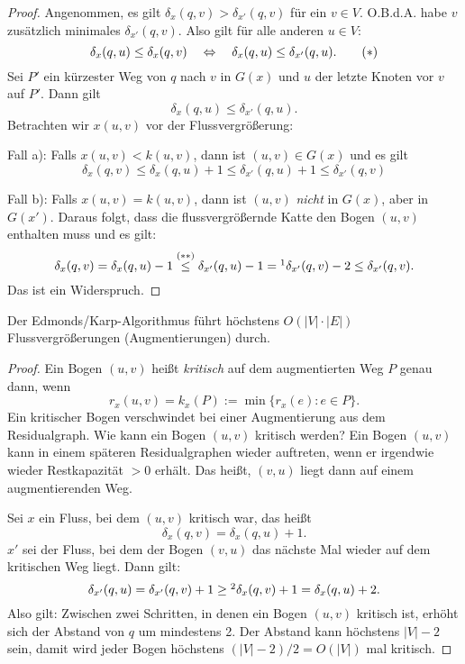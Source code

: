 \begin{proof}
  Angenommen, es gilt $\delta_x(q,v) > \delta_{x'}(q,v)$ für ein $v \in V$.
  O.B.d.A. habe $v$ zusätzlich minimales $\delta_{x'}(q,v)$. Also gilt für alle
  anderen $u \in V$:
  \[ \delta_x(q,u) \le \delta_x(q,v) \quad \Leftrightarrow \quad \delta_x(q,u) \le \delta_{x'}
    (q,u). \tag{$*$} \]
  Sei $P'$ ein kürzester Weg von $q$ nach $v$ in $G(x)$ und $u$ der letzte
  Knoten vor $v$ auf $P'$. Dann gilt
  \[ \delta_x (q,u) \le \delta_{x'}(q,u). \tag{$**$} \]
  Betrachten wir $x(u,v)$ vor der Flussvergrößerung:

  Fall a): Falls $x(u,v) < k(u,v)$, dann ist $(u,v) \in G(x)$ und es gilt
  \[ \delta_x(q,v) \le \delta_x(q,u) + 1
    \le \delta_{x'}(q,u) + 1 \le \delta_{x'}(q,v) \]

  Fall b): Falls $x(u,v) = k(u,v)$, dann ist $(u,v)$ \emph{nicht} in $G(x)$,
  aber in $G(x')$. Daraus folgt, dass die flussvergrößernde Katte den Bogen
  $(u,v)$ enthalten muss und es gilt:
  \[ \delta_x(q,v) = \delta_x(q,u) - 1
    \overset{(**)}{\le} \delta_{x'}(q,u) - 1
    =\footnotemark \delta_{x'}(q,v) - 2
    \le \delta_{x'}(q,v).
  \]
  Das ist ein Widerspruch.
\end{proof}

\begin{lem} %
  Der Edmonds/Karp-Algorithmus führt höchstens $O(|V| \cdot |E|)$
  Flussvergrößerungen (Augmentierungen) durch.
\end{lem}

\begin{proof}
  Ein Bogen $(u,v)$ heißt \emph{kritisch} auf dem augmentierten Weg $P$ genau
  dann, wenn
  \[ r_x(u,v) = k_x(P) := \min \{ r_x(e) : e \in P \}. \]
  Ein kritischer Bogen verschwindet bei einer Augmentierung aus dem
  Residualgraph. Wie kann ein Bogen $(u,v)$ kritisch werden? Ein Bogen $(u,v)$
  kann in einem späteren Residualgraphen wieder auftreten, wenn er irgendwie
  wieder Restkapazität $> 0$ erhält. Das heißt, $(v,u)$ liegt dann auf einem
  augmentierenden Weg.

  Sei $x$ ein Fluss, bei dem $(u,v)$ kritisch war, das heißt
  \[ \delta_x(q,v) = \delta_x(q,u) + 1. \]
  $x'$ sei der Fluss, bei dem der Bogen $(v,u)$ das nächste Mal wieder auf dem
  kritischen Weg liegt. Dann gilt:
  \[ \delta_{x'}(q,u) = \delta_{x'} (q,v) + 1
    \ge\footnotemark \delta_x(q,v) + 1 = \delta_x(q,u) + 2.  \]
  Also gilt: Zwischen zwei Schritten, in denen ein Bogen $(u,v)$ kritisch ist,
  erhöht sich der Abstand von $q$ um mindestens 2. Der Abstand kann höchstens
  $|V| - 2$ sein, damit wird jeder Bogen höchstens $(|V|-2)/2 = O(|V|)$ mal
  kritisch.
\end{proof}

